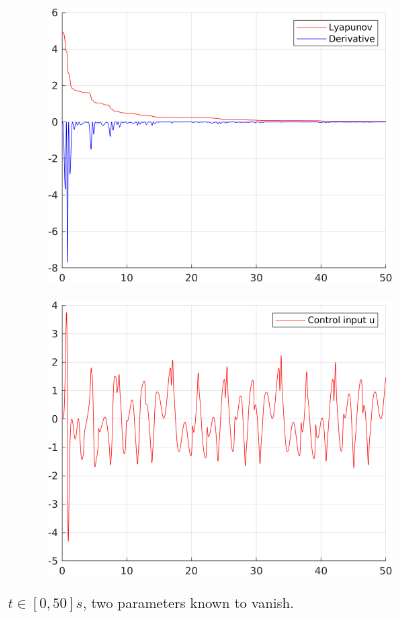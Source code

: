 \documentclass[12pt,a4paper]{article}
\begin{document}
\begin{figure}[H]
\begin{subfigure}{.45\textwidth}
			\includegraphics[width=1\textwidth]{Graphics/NonLinearLyapunovZero3.png}
		\end{subfigure}%
		\begin{subfigure}{.45\textwidth}
			\centering
			\includegraphics[width=1\textwidth]{Graphics/NonLinearControlZero3.png}
		\end{subfigure}
		\caption{$t \in [0,50]s$, two parameters known to vanish.}
	\end{figure}
\end{document}
